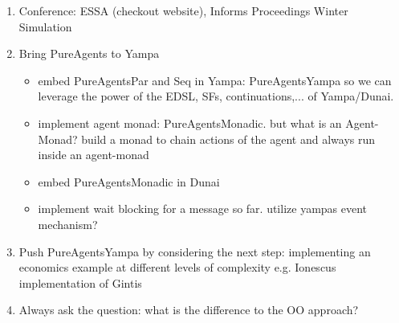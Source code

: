 \begin{enumerate}
\item Conference: ESSA (checkout website), Informs Proceedings Winter Simulation

\item Bring PureAgents to Yampa
	\begin{itemize}
		\item embed PureAgentsPar and Seq in Yampa: PureAgentsYampa so we can leverage the power of the EDSL, SFs, continuations,... of Yampa/Dunai.
		\item implement agent monad: PureAgentsMonadic. but what is an Agent-Monad? build a monad to chain actions of the agent and always run inside an agent-monad
		\item embed PureAgentsMonadic in Dunai
		\item implement wait blocking for a message so far. utilize yampas event mechanism?
	\end{itemize}
	
\item Push PureAgentsYampa by considering the next step: implementing an economics example at different levels of complexity e.g. Ionescus implementation of Gintis

\item Always ask the question: what is the difference to the OO approach? 
\end{enumerate} 


